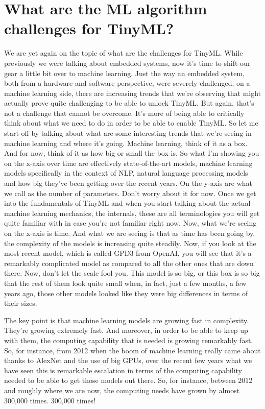\section{What are the ML algorithm challenges for TinyML?}


We are yet again on the topic of what are the challenges for TinyML.
While previously we were talking about embedded systems, now it's time to shift our gear a little bit over to machine learning.
Just the way an embedded system, both from a hardware and software perspective, were severely challenged, on a machine learning side, there are increasing trends that we're observing that might actually prove quite challenging to be able to unlock TinyML.
But again, that's not a challenge that cannot be overcome.
It's more of being able to critically think about what we need to do in order to be able to enable TinyML.
So let me start off by talking about what are some interesting trends that we're seeing in machine learning and where it's going.
Machine learning, think of it as a box.
And for now, think of it as how big or small the box is.
So what I'm showing you on the x-axis over time are effectively state-of-the-art models, machine learning models specifically in the context of NLP, natural language processing models and how big they've been getting over the recent years.
On the y-axis are what we call as the number of parameters.
Don't worry about it for now.
Once we get into the fundamentals of TinyML and when you start talking about the actual machine learning mechanics, the internals, these are all terminologies you will get quite familiar with in case you're not familiar right now.
Now, what we're seeing on the x-axis is time.
And what we are seeing is that as time has been going by, the complexity of the models is increasing quite steadily.
Now, if you look at the most recent model, which is called GPD3 from OpenAI, you will see that it's a remarkably complicated model as compared to all the other ones that
are down there.
Now, don't let the scale fool you.
This model is so big, or this box is so big that the rest of them look quite small when, in fact, just a few months, a few years ago, those other models looked like they were big differences in terms of their sizes.

The key point  is that machine learning models are growing fast in complexity.
They're growing extremely fast.
And moreover, in order to be able to keep up with them, the computing capability that is needed is growing remarkably fast.
So, for instance, from 2012 when the boom of machine learning really came about thanks to AlexNet and the use of big GPUs, over the recent few years what we have seen this is remarkable escalation in terms of the computing capability needed to be able to get those models out there.
So, for instance, between 2012 and roughly where we are now, the computing needs have grown by almost 300,000 times.
300,000 times!



